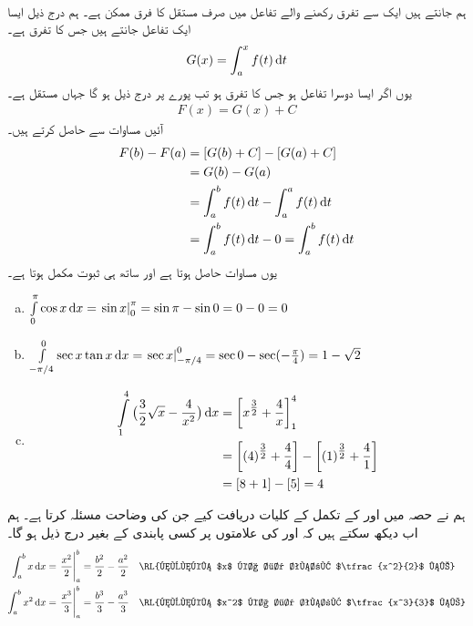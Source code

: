 \\
ہم جانتے ہیں  ایک سے تفرق رکھنے والے تفاعل میں صرف مستقل کا فرق ممکن ہے۔ ہم درج ذیل ایسا  ایک تفاعل جانتے ہیں  جس کا تفرق  ہے۔
\begin{align*}
G(x)=\int_a^xf(t)\dif t
\end{align*}
یوں اگر  ایسا دوسرا تفاعل ہو جس کا تفرق  ہو تب پورے  پر درج ذیل ہو گا جہاں  مستقل ہے۔
\begin{align}\label{مساوات_تکمل_بنیادی_مسئلہ_جزو_دوم_ب}
F(x)=G(x)+C
\end{align}
آئیں مساوات  سے  حاصل کرتے ہیں۔
\begin{align*}
F(b)-F(a)&=[G(b)+C]-[G(a)+C]\\
&=G(b)-G(a)\\
&=\int_a^bf(t)\dif t-\int_a^af(t)\dif t\\
&=\int_a^bf(t)\dif t-0=\int_a^bf(t)\dif t
\end{align*}
یوں مساوات  حاصل ہوتا ہے  اور ساتھ  ہی ثبوت مکمل ہوتا ہے۔
\begin{enumerate}[a.]
\item
$\int\limits_0^{\pi}\cos x\dif x=\left.\sin x\right|_0^{\pi}=\sin \pi-\sin 0=0-0=0$
\item
$\int\limits_{-\pi/4}^0\sec x\tan x\dif x=\left.\sec x\right|_{-\pi/4}^0=\sec 0-\sec(-\tfrac{\pi}{4})=1-\sqrt{2}$
\item
\begin{align*}\int\limits_1^4\big(\frac{3}{2}\sqrt{x}-\frac{4}{x^2}\big)\dif x&=\left[x^{\tfrac{3}{2}}+\frac{4}{x}\right]_1^4\\
&=\left[(4)^{\tfrac{3}{2}}+\frac{4}{4}\right]-\left[(1)^{\tfrac{3}{2}}+\frac{4}{1}\right]\\
&=[8+1]-[5]=4
\end{align*}
\end{enumerate}
ہم نے حصہ  میں  اور  کے تکمل کے کلیات دریافت کیے جن کی وضاحت مسئلہ  کرتا ہے۔ ہم اب دیکھ سکتے ہیں کہ  اور  کی علامتوں پر کسی پابندی کے بغیر درج ذیل ہو گا۔
\begin{align*}
\int_a^bx\dif x&=\left.\frac{x^2}{2}\right|_a^b=\frac{b^2}{2}-\frac{a^2}{2}&&\text{\RL{چونکہ $x$ کا ضد تفرق $\tfrac{x^2}{2}$ ہے}}\\
\int_a^bx^2\dif x&=\left.\frac{x^3}{3}\right|_a^b=\frac{b^3}{3}-\frac{a^3}{3}&&\text{\RL{چونکہ $x^2$ کا ضد تفرق $\tfrac{x^3}{3}$ ہے}}
\end{align*}

